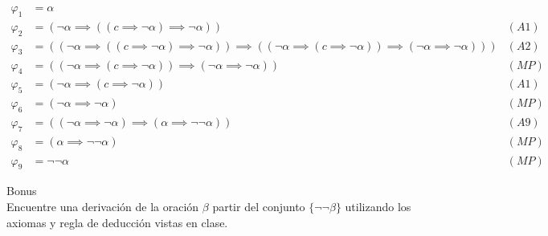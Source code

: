 \begin{sol}
    \begin{align*}
        \varphi_1 & = \alpha                                                                                                                                                                           \\
        \varphi_2 & = (\neg \alpha \implies ((c \implies \neg \alpha )\implies \neg \alpha))                                                                                                    & (A1) \\
        \varphi_3 & = ((\neg \alpha \implies ((c \implies \neg \alpha)\implies \neg \alpha))\implies ((\neg \alpha \implies (c \implies \neg \alpha))\implies(\neg \alpha \implies \neg \alpha))) & (A2) \\
        \varphi_4 & = ((\neg \alpha \implies (c \implies \neg \alpha))\implies (\neg \alpha \implies \neg \alpha))                                                                                & (MP) \\
        \varphi_5 & = (\neg \alpha \implies (c \implies \neg \alpha))                                                                                                                           & (A1) \\
        \varphi_6 & = (\neg \alpha \implies \neg \alpha)                                                                                                                                        & (MP) \\
        \varphi_7 & = ((\neg \alpha \implies \neg \alpha) \implies (\alpha \implies \neg \neg \alpha))                                                                                            & (A9) \\
        \varphi_8 & = (\alpha \implies \neg \neg \alpha)                                                                                                                                        & (MP) \\
        \varphi_9 & = \neg \neg \alpha                                                                                                                                                          & (MP)
    \end{align*}
\end{sol}

\begin{prob}
    Bonus
    \\
    Encuentre una derivación de la oración $\beta$  partir del conjunto $\{\neg \neg \beta\}$ utilizando los axiomas y regla de deducción vistas en clase.
\end{prob}

